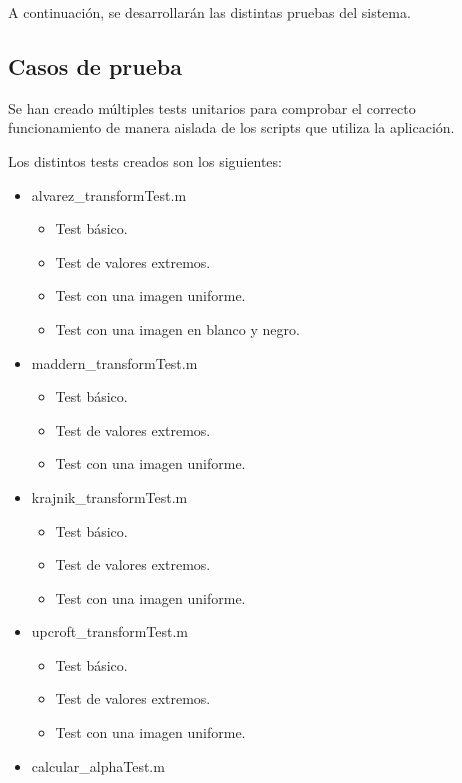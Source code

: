 A continuación, se desarrollarán las distintas pruebas del sistema.

\subsection{Casos de prueba}\label{casos-de-prueba}

Se han creado múltiples tests unitarios para comprobar el correcto funcionamiento de manera aislada de los scripts que utiliza la aplicación.

Los distintos tests creados son los siguientes:

\begin{itemize}
    \item alvarez\_transformTest.m
    \begin{itemize}
        \item Test básico.
        \item Test de valores extremos.
        \item Test con una imagen uniforme.
        \item Test con una imagen en blanco y negro.
    \end{itemize}
    \item maddern\_transformTest.m
    \begin{itemize}
        \item Test básico.
        \item Test de valores extremos.
        \item Test con una imagen uniforme.
    \end{itemize}
    \item krajnik\_transformTest.m
    \begin{itemize}
        \item Test básico.
        \item Test de valores extremos.
        \item Test con una imagen uniforme.
    \end{itemize}
    \item upcroft\_transformTest.m
    \begin{itemize}
        \item Test básico.
        \item Test de valores extremos.
        \item Test con una imagen uniforme.
    \end{itemize}
    \item calcular\_alphaTest.m
    \begin{itemize}

\end{itemize}
\end{itemize}
